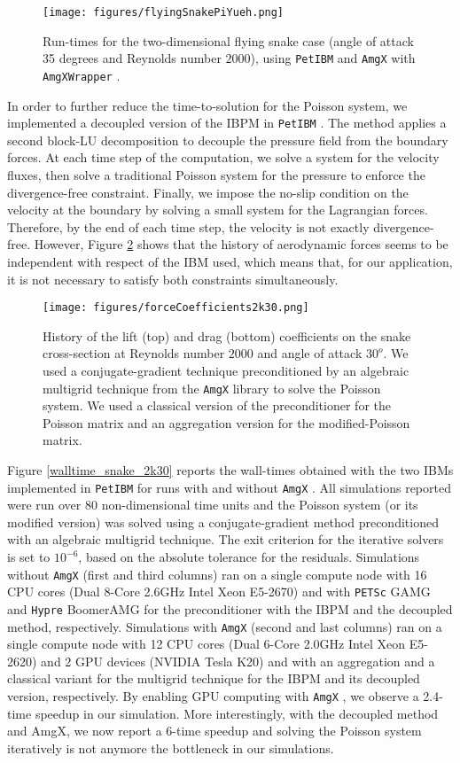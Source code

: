 \documentclass[10pt]{article}
\newcommand{\petibm}{\texttt{PetIBM} }
\newcommand{\petsc}{\texttt{PETSc} }
\newcommand{\amgx}{\texttt{AmgX} }
\newcommand{\amgxwrapper}{\texttt{AmgXWrapper} }
\newcommand{\hypre}{\texttt{Hypre} }
\begin{document}
\begin{figure}[h!]
\centering
\texttt{[image: figures/flyingSnakePiYueh.png]}
\caption{Run-times for the two-dimensional flying snake case (angle of attack 35 degrees and Reynolds number $2000$), using \petibm and \amgx with \amgxwrapper.}
\label{flying_snake_piyueh}
\end{figure}

In order to further reduce the time-to-solution for the Poisson system, we implemented a decoupled version of the IBPM \cite{Li_et_al_2016} in \petibm.
The method applies a second block-LU decomposition to decouple the pressure field from the boundary forces.
At each time step of the computation, we solve a system for the velocity fluxes, then solve a traditional Poisson system for the pressure to enforce the divergence-free constraint.
Finally, we impose the no-slip condition on the velocity at the boundary by solving a small system for the Lagrangian forces.
Therefore, by the end of each time step, the velocity is not exactly divergence-free.
However, Figure \ref{force_coefficients_snake_2k30} shows that the history of aerodynamic forces seems to be independent with respect of the IBM used, which means that, for our application, it is not necessary to satisfy both constraints simultaneously.

\begin{figure}[h!]
\centering
\texttt{[image: figures/forceCoefficients2k30.png]}
\caption{History of the lift (top) and drag (bottom) coefficients on the snake cross-section at Reynolds number $2000$ and angle of attack $30^o$. We used a conjugate-gradient technique preconditioned by an algebraic multigrid technique from the \amgx library to solve the Poisson system. We used a classical version of the preconditioner for the Poisson matrix and an aggregation version for the modified-Poisson matrix.}
\label{force_coefficients_snake_2k30}
\end{figure}

Figure \ref{walltime_snake_2k30} reports the wall-times obtained with the two IBMs implemented in \petibm for runs with and without \amgx.
All simulations reported were run over 80 non-dimensional time units and the Poisson system (or its modified version) was solved using a conjugate-gradient method preconditioned with an algebraic multigrid technique.
The exit criterion for the iterative solvers is set to $10^{-6}$, based on the absolute tolerance for the residuals.
Simulations without \amgx (first and third columns) ran on a single compute node with 16 CPU cores (Dual 8-Core 2.6GHz Intel Xeon E5-2670) and with \petsc GAMG and \hypre BoomerAMG for the preconditioner with the IBPM and the decoupled method, respectively.
Simulations with \amgx (second and last columns) ran on a single compute node with 12 CPU cores (Dual 6-Core 2.0GHz Intel Xeon E5-2620) and 2 GPU devices (NVIDIA Tesla K20) and with an aggregation and a classical variant for the multigrid technique for the IBPM and its decoupled version, respectively.
By enabling GPU computing with \amgx, we observe a 2.4-time speedup in our simulation.
More interestingly, with the decoupled method and AmgX, we now report a 6-time speedup and solving the Poisson system iteratively is not anymore the bottleneck in our simulations.
\end{document}
